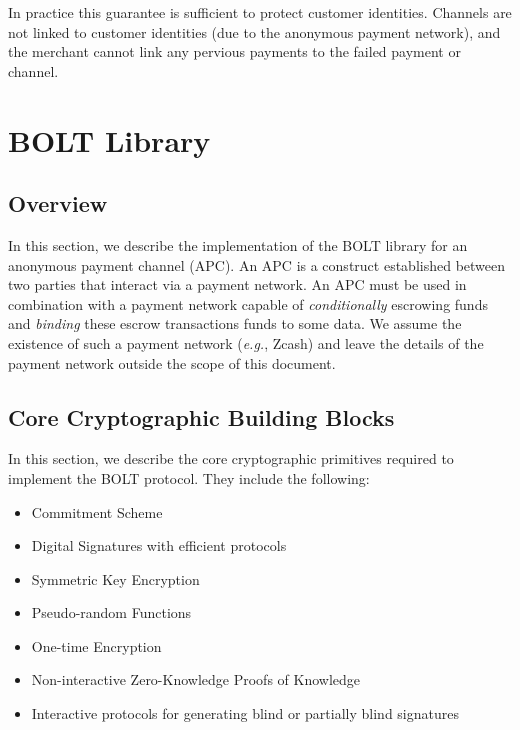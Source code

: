 \documentclass[11pt]{report}
\begin{document}
In practice this guarantee is sufficient to protect customer identities. Channels are not linked to customer identities (due to the anonymous payment network), and the merchant cannot link any pervious payments to the failed payment or channel.


\chapter{BOLT Library}
\label{ch:bolt}
\thispagestyle{myfancypage}

\section{Overview}

In this section, we describe the implementation of the BOLT library for an anonymous payment channel (APC). An APC is a construct established between two parties that interact via a payment network. An APC must be used in combination with a payment network capable of {\em conditionally} escrowing funds and {\em binding} these escrow transactions funds to some data. We assume the existence of such a payment network ({\em e.g.}, Zcash) and leave the details of the payment network outside the scope of this document.

\section{Core Cryptographic Building Blocks}
\label{sec:core}

In this section, we describe the core cryptographic primitives required to implement the BOLT protocol. They include the following:

\begin{itemize}
\item Commitment Scheme
\item Digital Signatures with efficient protocols
\item Symmetric Key Encryption
\item Pseudo-random Functions
\item One-time Encryption
\item Non-interactive Zero-Knowledge Proofs of Knowledge
\item Interactive protocols for generating blind or partially blind signatures
\end{itemize}
\end{document}
